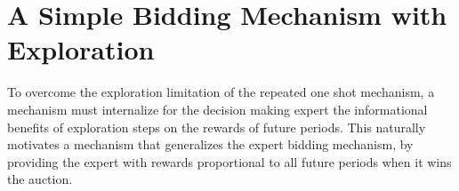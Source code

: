 





\section{A Simple Bidding Mechanism with Exploration}

To overcome the exploration limitation of the repeated one shot mechanism, a mechanism must internalize for the decision making expert the informational benefits of exploration steps on the rewards of future periods.
This naturally motivates a mechanism that generalizes the expert bidding mechanism, by providing the expert with rewards proportional to all future periods when it wins the auction.

